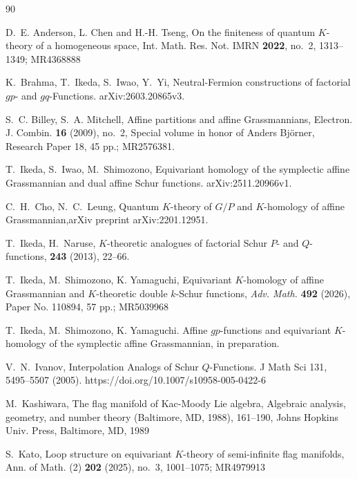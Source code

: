 \documentclass[a4paper]{amsart}
\theoremstyle{remark}
\numberwithin{equation}{section}
\begin{document}
\begin{thebibliography}{90}


 D.~E. Anderson, L. Chen and H.-H. Tseng, 
On the finiteness of quantum $K$-theory of a homogeneous space, Int. Math. Res. Not. IMRN {\bf 2022}, no.~2, 1313--1349; MR4368888

 K.~Brahma, T.~Ikeda, S.~Iwao,  Y.~Yi,
Neutral-Fermion constructions of factorial $gp$- and $gq$-Functions.
arXiv:2603.20865v3.

S.~C. Billey, S.~A. Mitchell, Affine partitions and affine Grassmannians, Electron. J. Combin. {\bf 16} (2009), no.~2, Special volume in honor of Anders Bj\"orner, Research Paper 18, 45 pp.; MR2576381.

 T.~Ikeda, S.~Iwao, M.~Shimozono, Equivariant homology of the symplectic affine Grassmannian and dual affine Schur functions.  arXiv:2511.20966v1.

 C.~H.~Cho, N.~C.~Leung,
  Quantum $K$-theory of $G/P$ and $K$-homology of affine Grassmannian,arXiv preprint arXiv:2201.12951.

T.~Ikeda, H.~Naruse,
\newblock $K$-theoretic analogues of factorial Schur \( P \)- and \( Q \)-functions,
 {\bf 243} (2013), 22--66.

 T.~Ikeda, M.~Shimozono, K. Yamaguchi, Equivariant $K$-homology of affine Grassmannian and $K$-theoretic double $k$-Schur functions, {\em Adv. Math.} {\bf 492} (2026), Paper No. 110894, 57 pp.; MR5039968

  T.~Ikeda, M.~Shimozono, K. Yamaguchi. Affine $gp$-functions and equivariant
 $K$-homology of the symplectic affine Grassmannian, in preparation.


 V.~N.~Ivanov,  Interpolation Analogs of Schur $Q$-Functions. J Math Sci 131, 5495–5507 (2005). https://doi.org/10.1007/s10958-005-0422-6

 M.~Kashiwara, The flag manifold of Kac-Moody Lie algebra, Algebraic analysis, geometry, and number theory (Baltimore, MD, 1988), 161–190, Johns Hopkins Univ.
Press, Baltimore, MD, 1989

 S.~Kato, Loop structure on equivariant $K$-theory of semi-infinite flag manifolds, Ann. of Math. (2) {\bf 202} (2025), no.~3, 1001--1075; MR4979913


\end{thebibliography}
\end{document}

